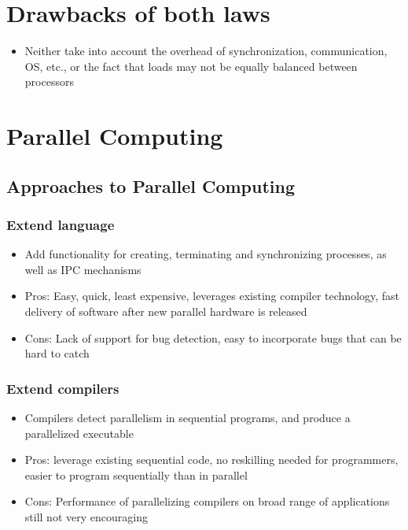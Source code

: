 \documentclass{article}
\begin{document}
\section{Drawbacks of both laws}
\begin{itemize}
    \item Neither take into account the overhead of synchronization, communication, OS, etc., or the fact that loads may not be equally balanced between processors
\end{itemize}

\section{Parallel Computing}
\subsection{Approaches to Parallel Computing}
\subsubsection{Extend language}
\begin{itemize}
    \item Add functionality for creating, terminating and synchronizing processes, as well as IPC mechanisms
    
    \item Pros: Easy, quick, least expensive, leverages existing compiler technology, fast delivery of software after new parallel hardware is released
    
    \item Cons: Lack of support for bug detection, easy to incorporate bugs that can be hard to catch
\end{itemize}


\subsubsection{Extend compilers}
\begin{itemize}
    \item Compilers detect parallelism in sequential programs, and produce a parallelized executable
    
    \item Pros: leverage existing sequential code, no reskilling needed for programmers, easier to program sequentially than in parallel
    
    \item Cons: Performance of parallelizing compilers on broad range of applications still not very encouraging
\end{itemize}
\end{document}
